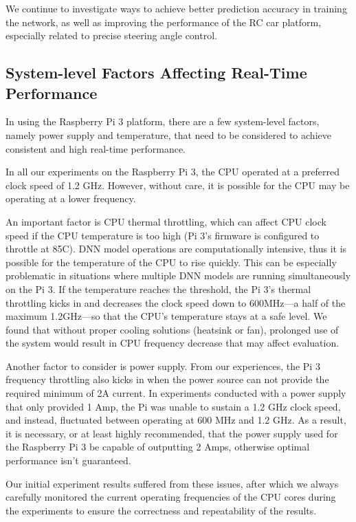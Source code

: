 We continue to investigate ways to achieve better prediction accuracy
in training the network, as well as improving the performance of the RC
car platform, especially related to precise steering angle control.

\subsection{System-level Factors Affecting Real-Time Performance}
In using the Raspberry Pi 3 platform, there are a
few system-level factors, namely power supply and temperature, that
need to be considered to achieve consistent and high real-time
performance. 

In all our experiments on the Raspberry Pi 3, the CPU  operated at a
preferred clock speed of 1.2 GHz. However, without care, it is
possible for the CPU may be operating at a lower frequency. 

An important factor is CPU thermal throttling, which can affect CPU
clock speed if the CPU temperature is too high (Pi 3's firmware is
configured to throttle at 85C).
DNN model operations are computationally intensive, thus it is
possible for the temperature of the CPU to rise quickly. This can be
especially problematic in situations where multiple DNN models are
running simultaneously on the Pi 3.
If the temperature reaches the threshold, the Pi 3's thermal
throttling kicks in and decreases the clock speed down to 600MHz---a
half of the maximum 1.2GHz---so that the CPU's temperature stays at a
safe level.
We found that without proper cooling solutions (heatsink or fan), 
prolonged use of the system would result in CPU frequency decrease
that may affect evaluation.

Another factor to consider is power supply. From our experiences, the
Pi 3 frequency throttling also kicks in when the power source can not
provide the required minimum of 2A current.
In experiments conducted with a power supply that only provided 1 Amp,
the Pi was unable to sustain a 1.2 GHz clock speed, and instead,
fluctuated between operating at 600 MHz and 1.2 GHz. As a result, it
is necessary, or at least highly recommended, that the power supply
used for the Raspberry Pi 3 be capable of outputting 2 Amps, otherwise
optimal performance isn't guaranteed.

Our initial experiment results suffered from these issues, after which
we always carefully monitored the current operating frequencies of the
CPU cores during the experiments to ensure the correctness and
repeatability of the results.
